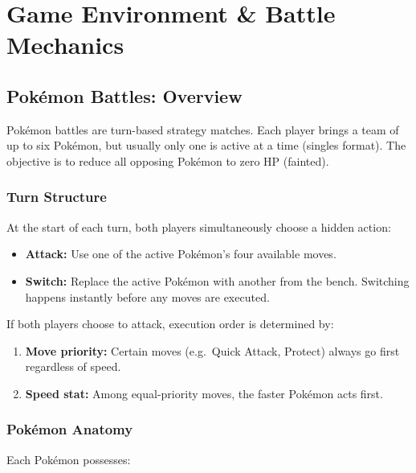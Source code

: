 \chapter{Game Environment \& Battle Mechanics}
\label{ch:game_env}

\section{Pok\'{e}mon Battles: Overview}

Pok\'{e}mon battles are turn-based strategy matches.  Each player brings a team
of up to six Pok\'{e}mon, but usually only one is active at a time (singles
format).  The objective is to reduce all opposing Pok\'{e}mon to zero HP
(fainted).

\subsection{Turn Structure}

At the start of each turn, both players simultaneously choose a hidden action:

\begin{itemize}
  \item \textbf{Attack:} Use one of the active Pok\'{e}mon's four available
        moves.
  \item \textbf{Switch:} Replace the active Pok\'{e}mon with another from the
        bench.  Switching happens instantly before any moves are executed.
\end{itemize}

If both players choose to attack, execution order is determined by:

\begin{enumerate}
  \item \textbf{Move priority:} Certain moves (e.g.\ Quick Attack, Protect)
        always go first regardless of speed.
  \item \textbf{Speed stat:} Among equal-priority moves, the faster
        Pok\'{e}mon acts first.
\end{enumerate}

\subsection{Pok\'{e}mon Anatomy}

Each Pok\'{e}mon possesses:

